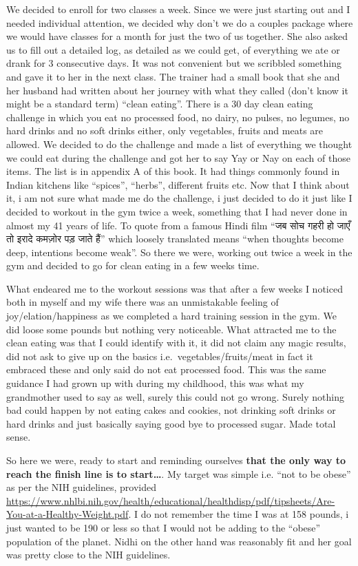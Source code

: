 \documentclass[oneside]{book}
\begin{document}
We decided to enroll for two classes a week. Since we were just starting
out and I needed individual attention, we decided why don't we do a
couples package where we would have classes for a month for just the two
of us together. She also asked us to fill out a detailed log, as
detailed as we could get, of everything we ate or drank for 3
consecutive days. It was not convenient but we scribbled something and
gave it to her in the next class. The trainer had a small book that she
and her husband had written about her journey with what they called
(don't know it might be a standard term) ``clean eating''. There is a 30
day clean eating challenge in which you eat no processed food, no dairy,
no pulses, no legumes, no hard drinks and no soft drinks either, only
vegetables, fruits and meats are allowed. We decided to do the challenge
and made a list of everything we thought we could eat during the
challenge and got her to say Yay or Nay on each of those items. The list
is in appendix A of this book. It had things commonly found in Indian
kitchens like ``spices'', ``herbs'', different fruits etc. Now that I
think about it, i am not sure what made me do the challenge, i just
decided to do it just like I decided to workout in the gym twice a week,
something that I had never done in almost my 41 years of life. To quote
from a famous Hindi film ``जब सोच गहरी हो जाएँ तो इरादे कमज़ोर पड़ जाते
हैं'' which loosely translated means ``when thoughts become deep,
intentions become weak''. So there we were, working out twice a week in
the gym and decided to go for clean eating in a few weeks time.

What endeared me to the workout sessions was that after a few weeks I
noticed both in myself and my wife there was an unmistakable feeling of
joy/elation/happiness as we completed a hard training session in the
gym. We did loose some pounds but nothing very noticeable. What
attracted me to the clean eating was that I could identify with it, it
did not claim any magic results, did not ask to give up on the basics
i.e.~vegetables/fruits/meat in fact it embraced these and only said do
not eat processed food. This was the same guidance I had grown up with
during my childhood, this was what my grandmother used to say as well,
surely this could not go wrong. Surely nothing bad could happen by not
eating cakes and cookies, not drinking soft drinks or hard drinks and
just basically saying good bye to processed sugar. Made total sense.

So here we were, ready to start and reminding ourselves \textbf{that the
only way to reach the finish line is to start\ldots{}}. My target was
simple i.e. ``not to be obese'' as per the NIH guidelines, provided
\url{https://www.nhlbi.nih.gov/health/educational/healthdisp/pdf/tipsheets/Are-You-at-a-Healthy-Weight.pdf}.
I do not remember the time I was at 158 pounds, i just wanted to be 190
or less so that I would not be adding to the ``obese'' population of the
planet. Nidhi on the other hand was reasonably fit and her goal was
pretty close to the NIH guidelines.
\end{document}
